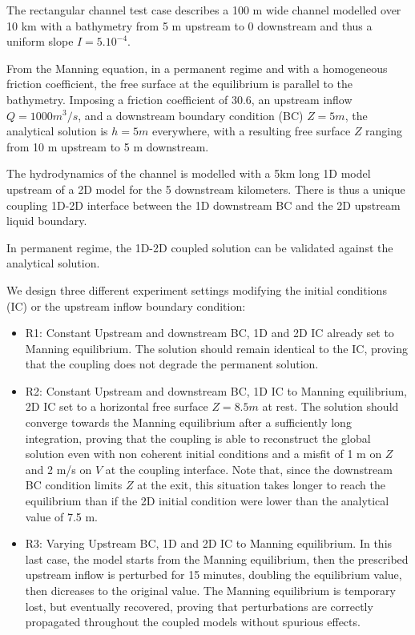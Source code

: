 \documentclass[Coupling]{../../data/TelemacDoc} %
\begin{document}
The rectangular channel test case describes a 100 m wide channel
modelled over 10 km with a bathymetry from 5 m upstream to 0
downstream and thus a uniform slope $I = 5.10^{-4}$.  

From the Manning equation, in a permanent regime and with a
homogeneous friction coefficient, the free surface at the equilibrium
is parallel to the bathymetry. Imposing a friction coefficient of
30.6, an upstream inflow $Q=1000 m^3/s$, and a downstream boundary
condition (BC) $Z=5 m$, the analytical solution is $h=5 m$ everywhere,
with a resulting free surface $Z$ ranging from 10 m upstream to 5 m
downstream.  

The hydrodynamics of the channel is modelled with a 5km long 1D model
upstream of a 2D model for the 5 downstream kilometers. There is thus
a unique coupling 1D-2D interface between the 1D downstream BC and the
2D upstream liquid boundary. 

In permanent regime, the 1D-2D coupled solution can be validated
against the analytical solution. 

We design three different experiment settings modifying the initial
conditions (IC) or the upstream inflow boundary condition:   
\begin{itemize}
\item R1: Constant Upstream and downstream BC, 1D and 2D IC already
  set to Manning equilibrium. The solution should remain identical to
  the IC, proving that the coupling does not degrade the permanent
  solution. 
\item R2: Constant Upstream and downstream BC, 1D IC to Manning
  equilibrium, 2D IC set to a horizontal free surface $Z = 8.5 m$ at
  rest. The solution should converge towards the Manning equilibrium
  after a sufficiently long integration, proving that the coupling is
  able to reconstruct the global solution even with non coherent
  initial conditions and a misfit of 1 m on $Z$ and 2 m/s on $V$ at
  the coupling interface. Note that, since the downstream BC
  condition limits $Z$ at the exit, this situation takes longer to
  reach the equilibrium than if the 2D initial condition were lower
  than the analytical value of 7.5 m.  
\item R3: Varying Upstream BC, 1D and 2D IC to Manning equilibrium. In
  this last case, the model starts from the Manning equilibrium, then
  the prescribed upstream inflow is perturbed for 15 minutes, doubling
  the equilibrium value, then dicreases to the original value. The
  Manning equilibrium is temporary lost, but eventually recovered,
  proving that perturbations are correctly propagated throughout the
  coupled models without spurious effects. 
\end{itemize}
\end{document}
